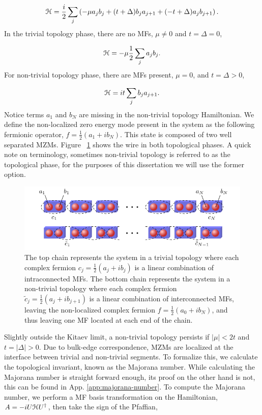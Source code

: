 \begin{equation}
  \mathcal{H} = \dfrac{i}{2} \sum_j \left( -\mu a_j b_j + (t+\Delta) b_j a_{j+1} + (-t+\Delta) a_j b_{j+1} \right).
\end{equation}
In the trivial topology phase, there are no MFs, $\mu \neq 0$ and $t=\Delta=0$,

\begin{equation}
  \mathcal{H} = -\mu\dfrac{1}{2} \sum_j a_j b_j.
\end{equation}
For non-trivial topology phase, there are MFs present, $\mu = 0$, and $t = \Delta > 0$,

\begin{equation}
  \mathcal{H} = it \sum_j b_j a_{j+1}.
\end{equation}
Notice terms $a_1$ and $b_N$ are missing in the non-trivial topology Hamiltonian.
We define the non-localized zero energy mode present in the system as the following fermionic operator, $f = \tfrac{1}{2}(a_1 + i b_N)$.
This state is composed of two well separated MZMs.
Figure ~\ref{fig:kitaev-chain} shows the wire in both topological phases.
A quick note on terminology, sometimes non-trivial topology is referred to as the topological phase, for the purposes of this dissertation we will use the former option.

\begin{figure}
  \includegraphics[width=\textwidth]{./figures/kitaev-chain.pdf}
  \caption{The top chain represents the system in a trivial topology where each complex fermion $c_j = \tfrac{1}{2}(a_j + i b_j)$ is a linear combination of intraconnected MFs. The bottom chain represents the system in a non-trivial topology where each complex fermion $\tilde{c}_j = \tfrac{1}{2}(a_j + i b_{j+1})$ is a linear combination of interconnected MFs, leaving the non-localized complex fermion $f = \tfrac{1}{2}(a_0 + i b_N)$, and thus leaving one MF located at each end of the chain.}
  \label{fig:kitaev-chain}
\end{figure}

Slightly outside the Kitaev limit, a non-trivial topology persists if $|\mu| < 2t$ and $t = |\Delta| >0$.
Due to bulk-edge correspondence, MZMs are localized at the interface between trivial and non-trivial segments.
To formalize this, we calculate the topological invariant, known as the Majorana number.
While calculating the Majorana number is straight forward enough, its proof on the other hand is not, this can be found in App. \ref{app:majorana-number}.
To compute the Majorana number, we perform a MF basis transformation on the Hamiltonian, $A = -iU \mathcal{H} U^{\dagger}$, then take the sign of the Pfaffian,

